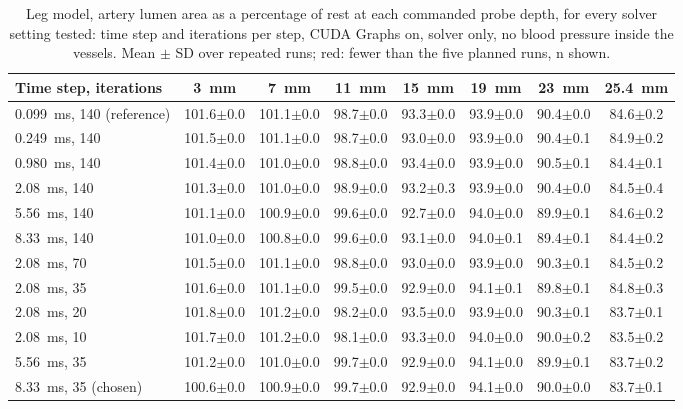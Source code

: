 \begin{table}[t]
\centering
\caption{Leg model, artery lumen area as a percentage of rest at each commanded probe depth, for every solver setting
tested: time step and iterations per step, CUDA Graphs on, solver only, no blood pressure inside the vessels. Mean
$\pm$ SD over repeated runs; red: fewer than the five planned runs, n shown.}
\label{tab:appendix_artery}
\footnotesize
\setlength{\tabcolsep}{3pt}
\begin{tabular}{lccccccc}
\hline
\textbf{Time step, iterations} & \textbf{3~mm} & \textbf{7~mm} & \textbf{11~mm} & \textbf{15~mm} & \textbf{19~mm} & \textbf{23~mm} & \textbf{25.4~mm} \\
\hline
0.099~ms, 140 (reference) & 101.6$\pm$0.0 & 101.1$\pm$0.0 & 98.7$\pm$0.0 & 93.3$\pm$0.0 & 93.9$\pm$0.0 & 90.4$\pm$0.0 & 84.6$\pm$0.2 \\
0.249~ms, 140 & 101.5$\pm$0.0 & 101.1$\pm$0.0 & 98.7$\pm$0.0 & 93.0$\pm$0.0 & 93.9$\pm$0.0 & 90.4$\pm$0.1 & 84.9$\pm$0.2 \\
0.980~ms, 140 & 101.4$\pm$0.0 & 101.0$\pm$0.0 & 98.8$\pm$0.0 & 93.4$\pm$0.0 & 93.9$\pm$0.0 & 90.5$\pm$0.1 & 84.4$\pm$0.1 \\
2.08~ms, 140 & 101.3$\pm$0.0 & 101.0$\pm$0.0 & 98.9$\pm$0.0 & 93.2$\pm$0.3 & 93.9$\pm$0.0 & 90.4$\pm$0.0 & 84.5$\pm$0.4 \\
5.56~ms, 140 & 101.1$\pm$0.0 & 100.9$\pm$0.0 & 99.6$\pm$0.0 & 92.7$\pm$0.0 & 94.0$\pm$0.0 & 89.9$\pm$0.1 & 84.6$\pm$0.2 \\
8.33~ms, 140 & 101.0$\pm$0.0 & 100.8$\pm$0.0 & 99.6$\pm$0.0 & 93.1$\pm$0.0 & 94.0$\pm$0.1 & 89.4$\pm$0.1 & 84.4$\pm$0.2 \\
2.08~ms, 70 & 101.5$\pm$0.0 & 101.1$\pm$0.0 & 98.8$\pm$0.0 & 93.0$\pm$0.0 & 93.9$\pm$0.0 & 90.3$\pm$0.1 & 84.5$\pm$0.2 \\
2.08~ms, 35 & 101.6$\pm$0.0 & 101.1$\pm$0.0 & 99.5$\pm$0.0 & 92.9$\pm$0.0 & 94.1$\pm$0.1 & 89.8$\pm$0.1 & 84.8$\pm$0.3 \\
2.08~ms, 20 & 101.8$\pm$0.0 & 101.2$\pm$0.0 & 98.2$\pm$0.0 & 93.5$\pm$0.0 & 93.9$\pm$0.0 & 90.3$\pm$0.1 & 83.7$\pm$0.1 \\
2.08~ms, 10 & 101.7$\pm$0.0 & 101.2$\pm$0.0 & 98.1$\pm$0.0 & 93.3$\pm$0.0 & 94.0$\pm$0.0 & 90.0$\pm$0.2 & 83.5$\pm$0.2 \\
5.56~ms, 35 & 101.2$\pm$0.0 & 101.0$\pm$0.0 & 99.7$\pm$0.0 & 92.9$\pm$0.0 & 94.1$\pm$0.0 & 89.9$\pm$0.1 & 83.7$\pm$0.2 \\
8.33~ms, 35 (chosen) & 100.6$\pm$0.0 & 100.9$\pm$0.0 & 99.7$\pm$0.0 & 92.9$\pm$0.0 & 94.1$\pm$0.0 & 90.0$\pm$0.0 & 83.7$\pm$0.1 \\
\hline
\end{tabular}
\end{table}
